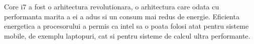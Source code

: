 Core i7 a fost o arhitectura revolutionara, o arhitectura care odata cu performanta marita a ei a
adus si un consum mai redus de energie. Eficienta energetica a procesorului a permis ca intel sa o
poata folosi atat pentru sisteme mobile, de exemplu laptopuri, cat si pentru sisteme de calcul
ultra performante.

